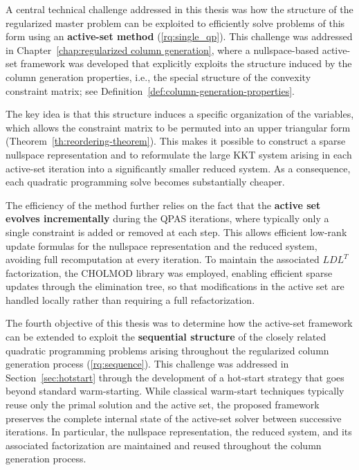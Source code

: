 \documentclass{book}
\theoremstyle{definition}
\numberwithin{algorithm_}{chapter}
\begin{document}
{\bigskip

A central technical challenge addressed in this thesis was how the structure of the regularized master problem can be exploited to efficiently solve problems of this form using an \textbf{active-set method} (\ref{rq:single_qp}). This challenge was addressed in Chapter~\ref{chap:regularized column generation}, where a nullspace-based active-set framework was developed that explicitly exploits the structure induced by the column generation properties, i.e., the special structure of the convexity constraint matrix; see Definition~\ref{def:column-generation-properties}.

The key idea is that this structure induces a specific organization of the variables, which allows the constraint matrix to be permuted into an upper triangular form (Theorem~\ref{th:reordering-theorem}). This makes it possible to construct a sparse nullspace representation and to reformulate the large KKT system arising in each active-set iteration into a significantly smaller reduced system. As a consequence, each quadratic programming solve becomes substantially cheaper.

The efficiency of the method further relies on the fact that the \textbf{active set evolves incrementally} during the QPAS iterations, where typically only a single constraint is added or removed at each step. This allows efficient low-rank update formulas for the nullspace representation and the reduced system, avoiding full recomputation at every iteration. To maintain the associated $LDL^T$ factorization, the \textsc{CHOLMOD} library was employed, enabling efficient sparse updates through the elimination tree, so that modifications in the active set are handled locally rather than requiring a full refactorization.

\bigskip

The fourth objective of this thesis was to determine how the active-set framework can be extended to exploit the \textbf{sequential structure} of the closely related quadratic programming problems arising throughout the regularized column generation process (\ref{rq:sequence}). This challenge was addressed in Section~\ref{sec:hotstart} through the development of a hot-start strategy that goes beyond standard warm-starting.
While classical warm-start techniques typically reuse only the primal solution and the active set, the proposed framework preserves the complete internal state of the active-set solver between successive iterations. In particular, the nullspace representation, the reduced system, and its associated factorization are maintained and reused throughout the column generation process.

}
\end{document}
